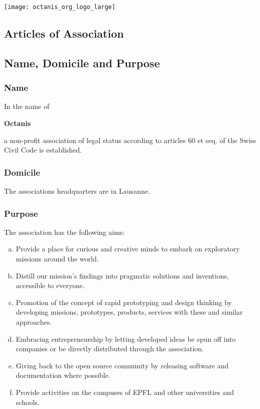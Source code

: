 \documentclass[12pt,a4paper,oneside]{article}
\newcounter{art}
\newcommand{\english}{    \switchcolumn[0]\noindent}
\begin{document}
\begin{center}
	\texttt{[image: octanis\_org\_logo\_large]}
\end{center}

\begin{paracol}{2}\sloppy



\english
	\section*{Articles of Association}
 	



\english
	\subsection{Name, Domicile and Purpose}
	\subsubsection{Name}
	In the name of
	\begin{center}
		\textbf{Octanis}
	\end{center}
	a non-profit association of legal status according to articles 60 et  seq.  of  the  Swiss  Civil  Code is established.



\english
	\subsubsection{Domicile}
	The associations headquarters are in Lausanne. 


\english
	\subsubsection{Purpose}
	The association has the following aims:

	\begin{enumerate}[(a)]

	\item Provide a place for curious and creative minds to embark on exploratory missions around the world.
	\item Distill our mission's findings into pragmatic solutions and inventions, accessible to everyone. 
	\item Promotion of the concept of rapid prototyping and design thinking by developing missions, prototypes, products, services with these and similar approaches.
	\item Embracing entrepreneurship by letting developed ideas be spun off into companies or be directly distributed through the association.
	\item Giving back to the open source community by releasing software and documentation where possible.
	\item Provide activities on the campuses of EPFL and other universities and schools.


\end{enumerate}
\end{paracol}
\end{document}
